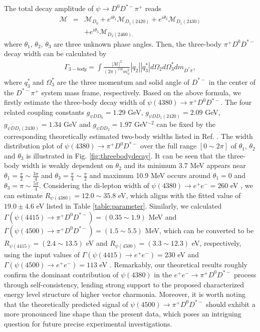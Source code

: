 \documentclass[prl,twocolumn,floatfix,amsmath,nofootinbib,amssymb,floatfix]{revtex4}
\begin{document}
The total decay amplitude of $\psi \to D^0D^{*-}\pi^{+}$ reads 
\begin{eqnarray}
\mathcal{M}&=&\mathcal{M}_{D_0}+e^{i\theta_1}\mathcal{M}_{D_1(2420)}+e^{i\theta_2}\mathcal{M}_{D_1(2430)} \nonumber\\
&&+e^{i\theta_3}\mathcal{M}_{D_2(2460),}
\end{eqnarray}
where $\theta_1$, $\theta_2$, $\theta_3$ are three unknown phase angles. Then, the three-body $\pi^{+}D^0D^{*-}$ decay width can be calculated by 
\begin{eqnarray}
\Gamma_{3-body}=\int\frac{|\mathcal{M}|^2}{(2\pi)^516m_{\psi}^2}|q_2||q_3^*|d\Omega_2d\Omega_3^*dm_{D^*\pi},
\end{eqnarray}
where $q_3^*$ and $\Omega_3^*$ are the three momentum and solid angle of $D^{*-}$ in the center of the $D^{*-}\pi^{+}$ system mass frame, respectively. Based on the above formula, we firstly estimate the three-body decay width of $\psi(4380) \to \pi^{+}D^0D^{*-}$. The four related coupling constants $g_{\psi DD_0}=1.29$ GeV, $g_{\psi DD_1(2420)}=2.09$ GeV, $g_{\psi DD_1(2430)}=1.34$ GeV and  $g_{\psi DD_2}=1.97$ GeV$^{-2}$  can be fixed by the corresponding theoretically estimated two-body widths listed in Ref. \cite{Wang:2019mhs}. The width distribution plot of $\psi(4380) \to \pi^{+} D^0D^{*-}$ over the full range $[0\sim2\pi]$ of $\theta_1$, $\theta_2$ and $\theta_3$ is illustrated in Fig. \ref{fig:threebodydecay}. It can be seen that the three-body width is weakly dependent on $\theta_2$ and its minimum 3.7 MeV appears near $\theta_1=\frac{\pi}{2}\sim\frac{3\pi}{4}$ and $\theta_3=\frac{\pi}{4}\sim\frac{\pi}{2}$ and maximum 10.9 MeV occurs around $\theta_1=0$ and $\theta_3=\pi\sim\frac{5\pi}{4}$. Considering the di-lepton width of $\psi(4380)\to e^+e^-=260$ eV \cite{Wang:2019mhs}, we can estimate  $R_{\psi(4380)}=12.0\sim35.8$ eV, which aligns with the fitted value of $19.0\pm4.6$ eV listed in Table \ref{table:parameter}. Similarly, we calculated $\Gamma(\psi(4415)\to \pi^{+}D^0D^{*-})=(0.35\sim1.9)$ MeV and $\Gamma(\psi(4500)\to \pi^{+}D^0D^{*-})=(1.5\sim5.5)$ MeV, which can be converted to be $R_{\psi(4415)}=(2.4\sim13.5)$ eV and $R_{\psi(4500)}=(3.3\sim12.3)$ eV, respectively, using the input values of $\Gamma(\psi(4415)\to e^+e^-)=230$ eV \cite{BES:2007zwq,Wang:2019mhs} and $\Gamma(\psi(4500)\to e^+e^-)=113$ eV \cite{Wang:2019mhs}. Remarkably, our theoretical results roughly confirm the dominant contribution of $\psi(4380)$ in the $e^+e^- \to\pi^+ D^0 D^{*-}$ process through self-consistency, lending strong support to the proposed characterized energy level structure of higher vector charmonia. Moreover, it is worth noting that the theoretically predicted signal of $\psi(4500)\to \pi^{+}D^0D^{*-}$ should exhibit a more pronounced line shape than the present data, which poses an intriguing question for future precise experimental investigations.
\end{document}
